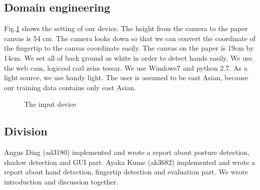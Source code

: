 \subsection{Domain engineering}
Fig.\ref{fig:1} shows the setting of our device. The height from the camera to the paper canvas is 54 cm. The camera looks down so that we can convert the coordinate of the fingertip to the canvas coordinate easily. The canvas on the paper is 19cm by 14cm. We set all of back ground as white in order to detect hands easily. We use the web cam, logicool carl zeiss tessar. We use Windows7 and python 2.7. As a light source, we use handy light. The user is assumed to be east Asian, because our training data contains only east Asian.
\begin{figure}
  \centering
 
 \caption{The input device}
 \label{fig:1}
\end{figure}
\subsection{Division}
Angus Ding (ad3180) implemented and wrote a report about posture detection, shadow detection and GUI part.
Ayaka Kume (ak3682) implemented and wrote a report about hand detection, fingertip detection and evaluation part.
We wrote introduction and discussion together.
\clearpage
\clearpage
